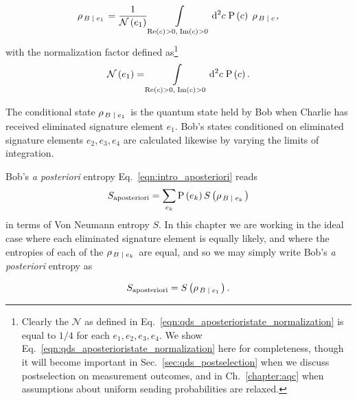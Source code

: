 \begin{equation}\label{eqn:qds_aposterioristate}
\rho_{\left. B \; \middle| \; e_1\right.} = \frac{1}{\mathcal{N}\left(e_1\right)} \int\limits_{\text{Re}\left(c\right) > 0, \; \text{Im}\left(c\right)>0} \mathop{}\!\mathrm{d^2} c \; \text{P}\left(c\right) \; \rho_{\left. B \; \middle| \;  c\right.},
\end{equation}
with the normalization factor defined as\footnote{Clearly the $\mathcal{N}$ as defined in Eq.~\ref{eqn:qds_aposterioristate_normalization} is equal to $1/4$ for each $e_1, e_2, e_3, e_4$. We show Eq.~\ref{eqn:qds_aposterioristate_normalization} here for completeness, though it will become important in Sec.~\ref{sec:qds_postselection} when we discuss postselection on measurement outcomes, and in Ch.~\ref{chapter:aqc} when assumptions about uniform sending probabilities are relaxed.}
\begin{equation}\label{eqn:qds_aposterioristate_normalization}
\mathcal{N}\left(e_1\right) = \int\limits_{\text{Re}\left(c\right) > 0, \; \text{Im}\left(c\right)>0} \mathop{}\!\mathrm{d^2} c \; \text{P}\left(c\right).
\end{equation}

\noindent The conditional state $\rho_{\left. B\; \middle| \; e_1\right.}$ is the quantum state held by Bob when Charlie has received eliminated signature element $e_1$. Bob's states conditioned on eliminated signature elements $e_2, e_3, e_4$ are calculated likewise by varying the limits of integration.

Bob's \emph{a posteriori} entropy Eq.~\ref{eqn:intro_aposteriori} reads
\begin{equation}
S_{\text{aposteriori}} = \sum_{e_k} \text{P}\left(e_k\right) S\left(\rho_{\left. B \; \middle| \; e_k\right.}\right)
\end{equation}
in terms of Von Neumann entropy $S$. In this chapter we are working in the ideal case where each eliminated signature element is equally likely, and where the entropies of each of the $\rho_{\left. B \; \middle| \; e_k\right.}$ are equal, and so we may simply write Bob's \emph{a posteriori} entropy as

\begin{equation}\label{eqn:aposteriori_entropy}
S_{\text{aposteriori}} = S\left(\rho_{\left. B \; \middle| \; e_1\right.}\right).
\end{equation}

